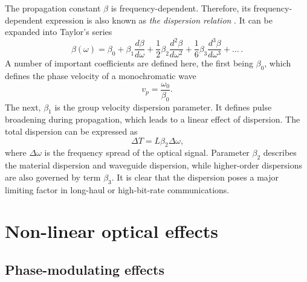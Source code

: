\documentclass{standalone}
\begin{document}
The propagation constant $\beta$ is frequency-dependent. Therefore, its frequency-dependent expression is also known as \textit{the dispersion relation} \cite{chalmers:foc}. It can be expanded into Taylor's series
\begin{equation}
\beta(\omega) = \beta_0 + \beta_1 \frac{d \beta}{d \omega} + \frac{1}{2} \beta_2 \frac{d^2 \beta}{d \omega^2} + \frac{1}{6} \beta_3 \frac{d^3 \beta}{d \omega^3} + \dots \, \textrm{.}
\end{equation}
A number of important coefficients are defined here, the first being $\beta_0$, which defines the phase velocity of a monochromatic wave
\begin{equation}
v_p = \frac{\omega_0}{\beta_0} \textrm{.}
\end{equation}
The next, $\beta_1$ is the group velocity dispersion parameter. It defines pulse broadening during propagation, which leads to a linear effect of dispersion. The total dispersion can be expressed as
\begin{equation}
\varDelta T = L \beta_2 \varDelta \omega \textrm{,}
\end{equation}
where $\varDelta \omega$ is the frequency spread of the optical signal. Parameter $\beta_2$ describes the material dispersion and waveguide dispersion, while higher-order dispersions are also governed by term $\beta_3$. It is clear that the dispersion poses a major limiting factor in long-haul or high-bit-rate communications.

\section{Non-linear optical effects}

\subsection{Phase-modulating effects}
\end{document}
